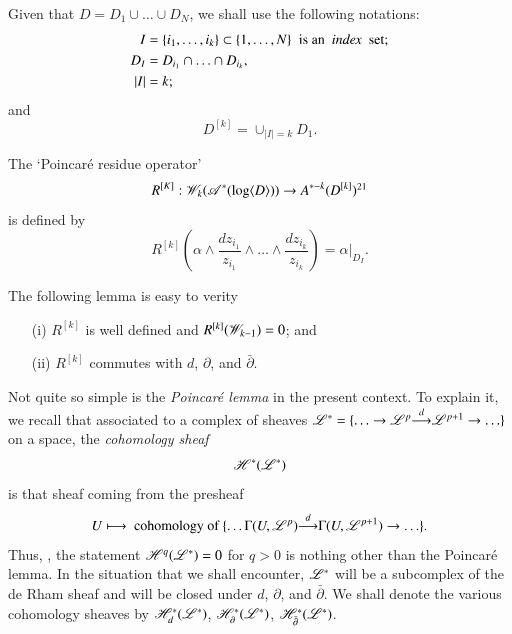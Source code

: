 Given that $D = D_1 \cup \ldots \cup D_N$, we shall use the following notations:
\begin{align*}
I & = \{i_1, \ldots , i_k\} \subset \{1, \ldots, N\} \; \text{ is an \textit{ index } set;}\\
D_I & = D_{i_1} \cap \ldots \cap D_{i_k},\\
|I| & = k;
\end{align*}
and 
$$
D^{[k]} = \cup_{|I|=k} D_1.
$$

\begin{defi*}
The `Poincar\'e residue operator'
$$
R^{[K]}: \sW_k (\sA^\ast (\log \langle D \rangle)) \to A^{\ast -k} (D^{[k]})\footnotemark[21]{}
$$
is defined by 
\begin{equation}
R^{[k]} \left(\alpha \wedge \frac{dz_{i_1}}{z_{i_1}} \wedge \ldots \wedge \frac{dz_{i_k}}{z_{i_k}} \right)  = \alpha|_{D_I}. 
\label{art4-eq5.11}
\end{equation}
\end{defi*}

The following lemma is easy to verity

\begin{lemma}\label{art4-lem12}
\begin{itemize}
\item[(i)] $R^{[k]}$ is well defined and $R^{[k]} (\mathscr{W}_{k-1}) = 0$; and 

\item[(ii)] $R^{[k]}$ commutes with $d$, $\partial$, and  $\bar{\partial}$.
\end{itemize}
\end{lemma}

Not quite so simple is the \textit{Poincar\'e lemma} in the present context. To explain it, we recall that associated to a complex of sheaves $\mathscr{L}^\ast = \{\ldots \to \mathscr{L}^p {\displaystyle{\mathop{\longrightarrow}^d}} \mathscr{L}^{p+1} \to \ldots \}$\pageoriginale on a space, the \textit{cohomology sheaf}
$$
\mathscr{H}^\ast (\mathscr{L}^\ast)
$$
is that sheaf coming from the presheaf
$$
U \longmapsto \text{ cohomology of } \{ \ldots \Gamma (U, \mathscr{L}^p) {\displaystyle{\mathop{\longrightarrow}^d}} \Gamma (U, \mathscr{L}^{p+1}) \to \ldots \}.
$$
Thus, \eg, the statement $\mathscr{H}^q (\mathscr{L}^\ast) = 0$ for $q>0$ is nothing other than the Poincar\'e lemma. In the situation that we shall encounter, $\mathscr{L}^\ast$ will be a subcomplex of the de Rham sheaf and will be closed under $d$, $\partial$, and $\bar{\partial}$. We shall denote the various cohomology sheaves by $\mathscr{H}^\ast_d (\mathscr{L}^\ast)$, $\mathscr{H}^\ast_\partial (\mathscr{L}^\ast)$, $\mathscr{H}^\ast_{\bar{\partial}}(\mathscr{L}^\ast)$.

